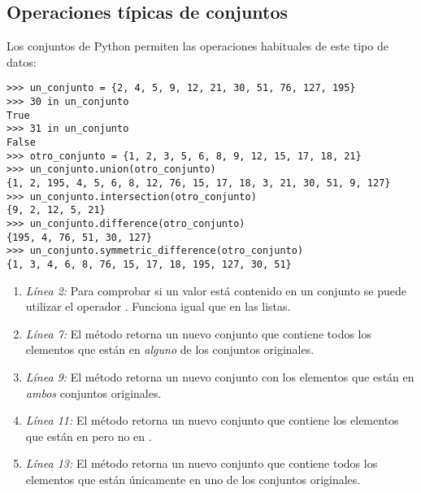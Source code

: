 \subsection{Operaciones típicas de conjuntos}

Los conjuntos de Python permiten las operaciones habituales de este tipo de datos:

\noindent\begin{minipage}{\textwidth}
\begin{lstlisting}[mathescape=True]
>>> un_conjunto = {2, 4, 5, 9, 12, 21, 30, 51, 76, 127, 195}
>>> 30 in un_conjunto
True
>>> 31 in un_conjunto
False
>>> otro_conjunto = {1, 2, 3, 5, 6, 8, 9, 12, 15, 17, 18, 21}
>>> un_conjunto.union(otro_conjunto)
{1, 2, 195, 4, 5, 6, 8, 12, 76, 15, 17, 18, 3, 21, 30, 51, 9, 127}
>>> un_conjunto.intersection(otro_conjunto)
{9, 2, 12, 5, 21}
>>> un_conjunto.difference(otro_conjunto)
{195, 4, 76, 51, 30, 127}
>>> un_conjunto.symmetric_difference(otro_conjunto)
{1, 3, 4, 6, 8, 76, 15, 17, 18, 195, 127, 30, 51}
\end{lstlisting}
\end{minipage}

\begin{enumerate}

\item \emph{Línea 2:} Para comprobar si un valor está contenido en un conjunto se puede utilizar el operador . Funciona igual que en las listas.

\item \emph{Línea 7:} El método  retorna un nuevo conjunto que contiene todos los elementos que están en \emph{alguno} de los conjuntos originales.

\item \emph{Línea 9:} El método  retorna un nuevo conjunto con los elementos que están en \emph{ambos} conjuntos originales.

\item \emph{Línea 11:} El método  retorna un nuevo conjunto que contiene los elementos que están en  pero no en .

\item \emph{Línea 13:} El método  retorna un nuevo conjunto que contiene todos los elementos que están únicamente en uno de los conjuntos originales.

\end{enumerate}

